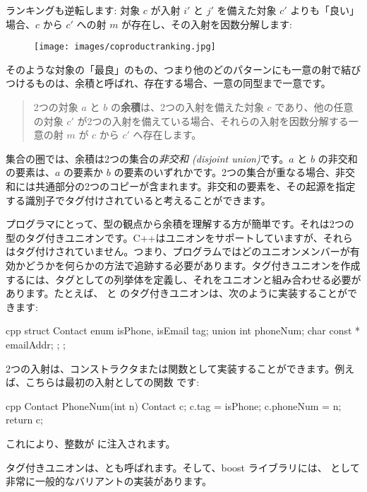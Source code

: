 \noindent
ランキングも逆転します: 対象 $c$ が入射 $i'$ と $j'$ を備えた対象 $c'$ よりも「良い」場合、$c$ から $c'$ への射 $m$ が存在し、その入射を因数分解します: 


\begin{figure}[H]
  \centering
  \texttt{[image: images/coproductranking.jpg]}
\end{figure}

\noindent
そのような対象の「最良」のもの、つまり他のどのパターンにも一意の射で結びつけるものは、余積と呼ばれ、存在する場合、一意の同型まで一意です。

\begin{quote}
  2つの対象 $a$ と $b$ の\textbf{余積}は、2つの入射を備えた対象 $c$ であり、他の任意の対象 $c'$ が2つの入射を備えている場合、それらの入射を因数分解する一意の射 $m$ が $c$ から $c'$ へ存在します。
\end{quote}

\noindent
集合の圏では、余積は2つの集合の\emph{非交和 (disjoint union)}です。$a$ と $b$ の非交和の要素は、$a$ の要素か $b$ の要素のいずれかです。2つの集合が重なる場合、非交和には共通部分の2つのコピーが含まれます。非交和の要素を、その起源を指定する識別子でタグ付けされていると考えることができます。

プログラマにとって、型の観点から余積を理解する方が簡単です。それは2つの型のタグ付きユニオンです。C++はユニオンをサポートしていますが、それらはタグ付けされていません。つまり、プログラムではどのユニオンメンバーが有効かどうかを何らかの方法で追跡する必要があります。タグ付きユニオンを作成するには、タグとしての列挙体を定義し、それをユニオンと組み合わせる必要があります。たとえば、 と  のタグ付きユニオンは、次のように実装することができます:

\begin{snip}{cpp}
struct Contact {
    enum { isPhone, isEmail } tag;
    union { int phoneNum; char const * emailAddr; };
};
\end{snip}
2つの入射は、コンストラクタまたは関数として実装することができます。例えば、こちらは最初の入射としての関数  です:

\begin{snip}{cpp}
Contact PhoneNum(int n) {
    Contact c;
    c.tag = isPhone;
    c.phoneNum = n;
    return c;
}
\end{snip}
これにより、整数が  に注入されます。

タグ付きユニオンは、とも呼ばれます。そして、boost ライブラリには、 として非常に一般的なバリアントの実装があります。

